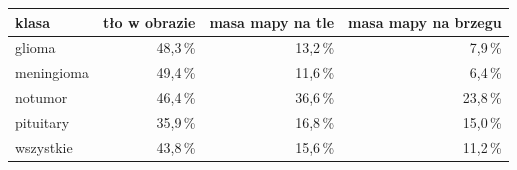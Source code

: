 \begin{tabular}{lrrr}
\toprule
klasa & tło w obrazie & masa mapy na tle & masa mapy na brzegu \\
\midrule
glioma & 48,3\,\% & 13,2\,\% & 7,9\,\% \\
meningioma & 49,4\,\% & 11,6\,\% & 6,4\,\% \\
notumor & 46,4\,\% & 36,6\,\% & 23,8\,\% \\
pituitary & 35,9\,\% & 16,8\,\% & 15,0\,\% \\
\midrule
wszystkie & 43,8\,\% & 15,6\,\% & 11,2\,\% \\
\bottomrule
\end{tabular}

